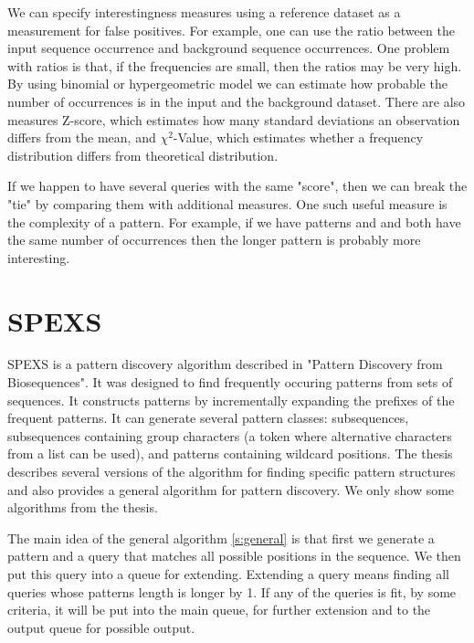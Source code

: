 We can specify interestingness measures using a reference dataset as a measurement for false positives. For example, one can use the ratio between the input sequence occurrence and background sequence occurrences. One problem with ratios is that, if the frequencies are small, then the ratios may be very high. By using binomial\cite{Binomial} or hypergeometric model we can estimate how probable the number of occurrences is in the input and the background dataset. There are also measures Z-score\cite{ZScores}, which estimates how many standard deviations an observation differs from the mean, and $\chi^2$-Value\cite{ChiValue}, which estimates whether a frequency distribution differs from theoretical distribution.

If we happen to have several queries with the same "score", then we can break the "tie" by comparing them with additional measures. One such useful measure is the complexity of a pattern. For example, if we have patterns  and  and both have the same number of occurrences then the longer pattern is probably more interesting.

\section{SPEXS}

SPEXS is a pattern discovery algorithm described in "Pattern Discovery from Biosequences"\cite{spexs}. It was designed to find frequently occuring patterns from sets of sequences. It constructs patterns by incrementally expanding the prefixes of the frequent patterns. It can generate several pattern classes: subsequences, subsequences containing group characters (a token where alternative characters from a list can be used), and patterns containing wildcard positions. The thesis describes several versions of the algorithm for finding specific pattern structures and also provides a general algorithm for pattern discovery. We only show some algorithms from the thesis.

The main idea of the general algorithm \ref{s:general} is that first we generate a pattern and a query that matches all possible positions in the sequence. We then put this query into a queue for extending. Extending a query means finding all queries whose patterns length is longer by 1. If any of the queries is fit, by some criteria, it will be put into the main queue, for further extension and to the output queue for possible output.

